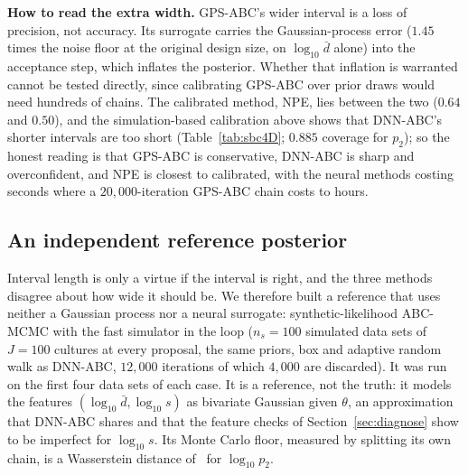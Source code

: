 \documentclass[sn-basic,iicol,pdflatex]{sn-jnl}
\begin{document}
\begin{table}[!t]
\centering
\caption{Wasserstein distance of each posterior from the GPS-ABC posterior for the same data set, per parameter ($\log_{10}$ units for
$p_1,p_2,\delta$; mean $\pm$ s.e.\ over twenty data sets).}
\label{tab:fid4D}
\small
\scriptsize\setlength{\tabcolsep}{2pt}

\end{table}

\noindent\textbf{How to read the extra width.} GPS-ABC's wider interval is a loss of precision, not accuracy. Its surrogate carries the Gaussian-process error
($1.45$ times the noise floor at the original design size, on $\log_{10}\bar d$ alone) into the acceptance step, which inflates the posterior. Whether that inflation is warranted cannot be tested
directly, since calibrating GPS-ABC over prior draws would need hundreds of chains. The calibrated method, NPE, lies between the two ($0.64$ and $0.50$), and the simulation-based
calibration above shows that DNN-ABC's shorter intervals are too short (Table~\ref{tab:sbc4D}; $0.885$ coverage for $p_2$); so the honest reading is that GPS-ABC is conservative, DNN-ABC is sharp and overconfident, and NPE is closest to calibrated, with the neural methods costing seconds where a $20{,}000$-iteration GPS-ABC chain costs \gtrCaseTwoHours{} to \gtrCaseOneHours{} hours.


\subsection{An independent reference posterior}
\label{sec:oracle}

Interval length is only a virtue if the interval is right, and the three methods disagree about how wide it should be. We therefore
built a reference that uses neither a Gaussian process nor a neural surrogate: synthetic-likelihood ABC-MCMC
\citep{wood2010,price2018} with the fast simulator in the loop ($n_s=100$ simulated data sets of $J=100$ cultures at every proposal,
the same priors, box and adaptive random walk as DNN-ABC, $12{,}000$ iterations of which $4{,}000$ are discarded). It was run on the first four data sets of each case. It is a reference, not the truth: it models
the features $(\log_{10}\bar d,\log_{10}s)$ as bivariate Gaussian given $\theta$, an approximation that DNN-ABC shares and that the feature
checks of Section~\ref{sec:diagnose} show to be imperfect for $\log_{10}s$. Its Monte Carlo floor, measured by splitting its own chain,
is a Wasserstein distance of \ptwoMcFloorWOneLogPTwo\ for $\log_{10}p_2$.
\end{document}
